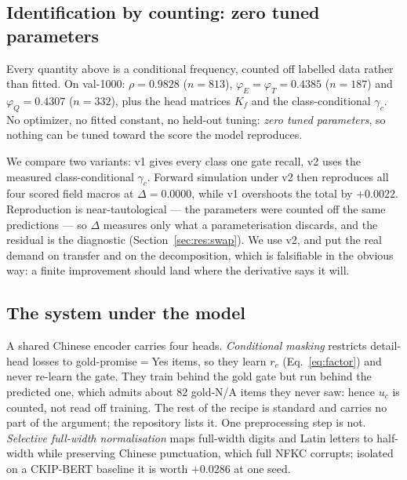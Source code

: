 \subsection{Identification by counting: zero tuned parameters}
\label{sec:identify}

Every quantity above is a conditional frequency, counted off labelled data rather than fitted. On
val-1000: $\rho=0.9828$ ($n{=}813$), $\varphi_E{=}\varphi_T=0.4385$ ($n{=}187$) and
$\varphi_Q=0.4307$ ($n{=}332$), plus the head matrices $K_f$ and the class-conditional $\gamma_c$.
No optimizer, no fitted constant, no held-out tuning: \emph{zero tuned parameters}, so nothing can
be tuned toward the score the model reproduces.

We compare two variants: v1 gives every class one gate recall, v2 uses the measured
class-conditional $\gamma_c$. Forward simulation under v2 then reproduces all four scored field macros at
$\Delta=0.0000$, while v1 overshoots the total by $+0.0022$. Reproduction is near-tautological ---
the parameters were counted off the same predictions --- so $\Delta$ measures only what a
parameterisation discards, and the residual is the diagnostic
(Section~\ref{sec:res:swap}). We use v2, and put the real demand on transfer and on the
decomposition, which is falsifiable in the obvious way: a finite improvement should land where the
derivative says it will.

\subsection{The system under the model}
\label{sec:system}

 A shared Chinese encoder carries four heads. \emph{Conditional
masking} restricts detail-head losses to gold-promise${=}$Yes items, so they learn $r_c$
(Eq.~\eqref{eq:factor}) and never re-learn the gate. They train behind the gold gate but run
behind the predicted one, which admits about 82 gold-N/A items they never saw: hence $u_c$ is
counted, not read off training. The rest of the recipe is standard and carries no part of the
argument; the repository lists it. One preprocessing step is not. \emph{Selective
full-width normalisation} maps full-width digits and Latin letters to half-width while preserving
Chinese punctuation, which full NFKC corrupts; isolated on a CKIP-BERT baseline it is worth
$+0.0286$ at one seed.

